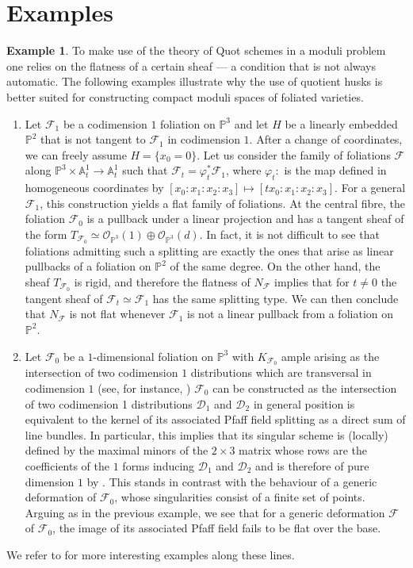 \documentclass[12pt, a4paper]{amsart}
\newcommand\PP{\mathbb{P}}
\newcommand\DD{\mathcal{D}}
\newcommand\OO{\mathcal{O}}
\newcommand\FF{\mathcal{F}}
\newcounter{Theorem}
\theoremstyle{definition}
\newtheorem{ej}[theorem]{Example}
\theoremstyle{named}
\begin{document}
\section{Examples}
\label{s_examples}


\begin{ej}\label{ex:QHusk is necessary} 
To make use of the theory of Quot schemes in a moduli problem one relies on the flatness of a certain sheaf — a condition that is not always automatic. The following examples illustrate why the use of quotient husks is better suited for constructing compact moduli spaces of foliated varieties.
\begin{enumerate}
    \item Let $\FF_1$ be a codimension $1$ foliation on $\mathbb{P}^3$ and let $H$ be a linearly embedded $\PP^2$ that is not tangent to $\FF_1$ in codimension $1$. After a change of coordinates, we can freely assume $H=\{x_0=0\}$. Let us consider the family of foliations $\FF$ along $\PP^3\times \mathbb A^1_t\to \mathbb A^1_t$ such that $\FF_t=\varphi_t^*\FF_1$, where $\varphi_t:$ is the map defined in homogeneous coordinates by $[x_0:x_1:x_2:x_3]\mapsto [tx_0:x_1:x_2:x_3]$. For a general $\FF_1$, this construction yields a flat family of foliations. At the central fibre, the foliation $\FF_0$ is a pullback under a linear projection and has a tangent sheaf of the form $T_{\FF_0}\simeq \OO_{\PP^3}(1)\oplus \OO_{\PP^3}(d)$. In fact, it is not difficult to see that foliations admitting such a splitting are exactly the ones that arise as linear pullbacks of a foliation on $\mathbb P^2$ of the same degree. On the other hand, the sheaf $T_{\FF_0}$ is rigid, and therefore the flatness of $N_\FF$ implies that for $t\neq0$ the tangent sheaf of $\FF_t\simeq \FF_1$ has the same splitting type. We can then conclude that $N_\FF$ is not flat whenever $\FF_1$ is not a linear pullback from a foliation on $\PP^2$.
    \item Let $\FF_0$ be a $1$-dimensional foliation on $\PP^3$ with $K_{\FF_0}$ ample arising as the intersection of two codimension $1$ distributions which are transversal in codimension $1$ (see, for instance, \cite[Example 5.5]{correa2023classification})
  $\FF_0$ can be constructed as the intersection of two codimension 1 distributions $\DD_1$ and $\DD_2$ in general position is equivalent to the kernel of its associated Pfaff field splitting as a direct sum of line bundles. In particular, this implies that its singular scheme is (locally) defined by the maximal minors of the $2\times 3$ matrix whose rows are the coefficients of the $1$ forms inducing $\DD_1$ and $\DD_2$ and is therefore of pure dimension $1$ by \cite[Theorem 5.1]{artin1976lectures}. This stands in contrast with the behaviour of a generic deformation of 
$\FF_0$, whose singularities consist of a finite set of points. Arguing as in the previous example, we see that for a generic deformation $\FF$ of $\FF_0$, the image of its associated Pfaff field fails to be flat over the base.
\end{enumerate}



We refer to \cite{quallbrunn2015families}
for more interesting examples along these lines.

\end{ej}
\end{document}
